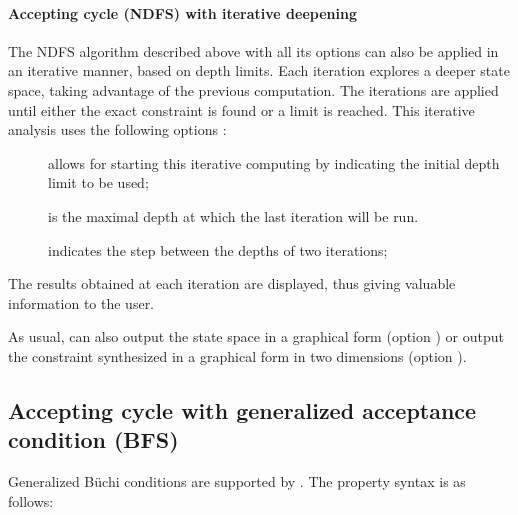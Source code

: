 \paragraph{Accepting cycle (NDFS) with iterative deepening}\label{sss:accepting-loop-NDFS-iterative}

The NDFS algorithm described above with all its options
can also be applied
in an iterative manner, based on depth limits. Each iteration explores a deeper state
space, taking advantage of the previous computation. The iterations are applied until
either the exact constraint is found or a limit is reached. This iterative analysis
uses the following options :

\begin{description}
	\item[] allows for starting this iterative computing by indicating
	      the initial depth limit to be used;
	\item[] is the maximal depth at which the last iteration
	      will be run.
	\item[] indicates the step between the depths of two iterations;
\end{description}

The results obtained at each iteration are displayed, thus giving valuable information
to the user.

\medskip


As usual, \imitator{} can also
output the state space in a graphical form (option )
or
output the constraint synthesized in a graphical form in two dimensions (option ).



\subsection{Accepting cycle with generalized acceptance condition (BFS)}\label{sss:generalized-accepting-loop-BFS}

Generalized Büchi conditions are supported by \imitator{}.
The property syntax is as follows:


